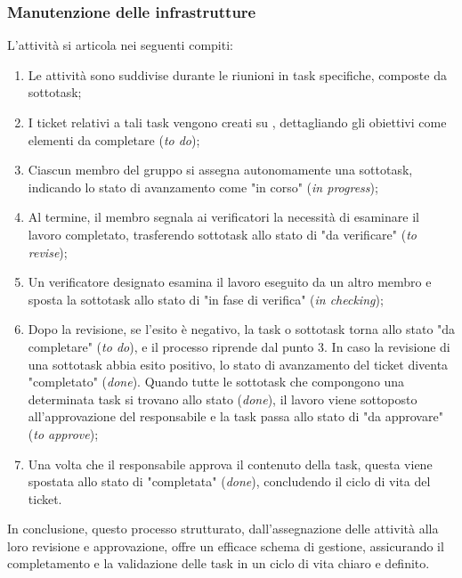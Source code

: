 \subsubsection{Manutenzione delle infrastrutture}
L'attività si articola nei seguenti compiti:
            \begin{enumerate}
                
            \item Le attività sono suddivise durante le riunioni in task specifiche, composte da sottotask;
            \item I ticket relativi a tali task vengono creati su , dettagliando gli obiettivi come elementi da completare (\textit{to do});
            \item Ciascun membro del gruppo si assegna autonomamente una sottotask, indicando lo stato di avanzamento come "in corso" (\textit{in progress});
            \item Al termine, il membro segnala ai verificatori la necessità di esaminare il lavoro completato, trasferendo sottotask allo stato di "da verificare" (\textit{to revise});
            \item Un verificatore designato esamina il lavoro eseguito da un altro membro e sposta la sottotask allo stato di "in fase di verifica" (\textit{in checking});
            \item Dopo la revisione, se l'esito è negativo, la task o sottotask torna allo stato "da completare" (\textit{to do}), e il processo riprende dal punto 3. In caso la revisione di una sottotask abbia esito positivo, lo stato di avanzamento del ticket diventa "completato" (\textit{done}). Quando tutte le sottotask che compongono una determinata task si trovano allo stato (\textit{done}), il lavoro viene sottoposto all'approvazione del responsabile e la task passa allo stato di "da approvare" (\textit{to approve});
            \item Una volta che il responsabile approva il contenuto della task, questa viene spostata allo stato di "completata" (\textit{done}), concludendo il ciclo di vita del ticket.
            \end{enumerate}
In conclusione, questo processo strutturato, dall'assegnazione delle attività alla loro revisione e approvazione, offre un efficace schema di gestione, assicurando il completamento e la validazione delle task in un ciclo di vita chiaro e definito.

